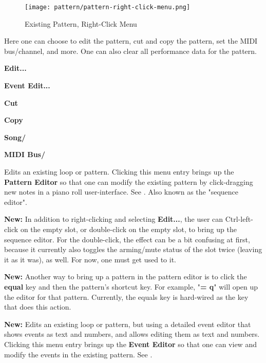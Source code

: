 \begin{figure}[H]
   \centering 
   \texttt{[image: pattern/pattern-right-click-menu.png]}
   \caption{Existing Pattern, Right-Click Menu}
   \label{fig:pattern_window_right_click}
\end{figure}

   Here one can choose to edit the pattern, cut and copy the pattern,
   set the MIDI bus/channel, and more.
   One can also clear all performance data for the pattern.
   
   \begin{enumber}
      \item \textbf{Edit...}
      \item \textbf{Event Edit...}
      \item \textbf{Cut}
      \item \textbf{Copy}
      \item \textbf{Song/}
      \item \textbf{MIDI Bus/}
   \end{enumber}

   \setcounter{ItemCounter}{0}      %

   Edits an existing loop or pattern.
   Clicking this menu entry brings up the \textbf{Pattern Editor}
   so that one can modify the existing pattern by click-dragging new notes in a
   piano roll user-interface.
   See .
   Also known as the "sequence editor".

   \textbf{New:}
   In addition to right-clicking and selecting \textbf{Edit...}, the user
   can Ctrl-left-click on the empty slot, or
   double-click on the empty slot, to bring up the sequence
   editor.  For the double-click, the effect can be a bit confusing at first,
   because it currently also toggles the arming/mute status of the slot
   twice (leaving it as it was), as well.  For now, one must get used to it.

   \textbf{New:}
   Another way to bring up a pattern in the pattern editor is to
   click the \textbf{equal} key and then the pattern's shortcut key.
   For example, "\textbf{= q}" will open up the editor for that pattern.
   Currently, the equals key is hard-wired as the key that does this action.

   \textbf{New:}
   Edits an existing loop or pattern, but using a detailed event editor that
   shows events as text and numbers, and allows editing them as text and
   numbers.
   Clicking this menu entry brings up the \textbf{Event Editor}
   so that one can view and modify the events in the existing pattern.
   See .

